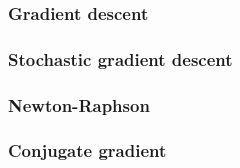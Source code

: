 \subsubsection{Gradient descent}
\subsubsection{Stochastic gradient descent}
\subsubsection{Newton-Raphson}
\subsubsection{Conjugate gradient}

